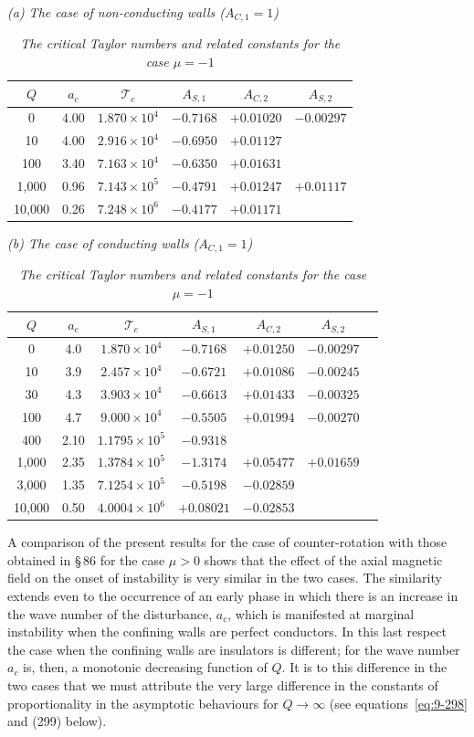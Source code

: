 \begin{table}[ht]
\centering
\caption*{TABLE XLIV}
\caption*{\textit{The critical Taylor numbers and related constants for the case $\mu = -1$}}
\medskip
\textit{(a) The case of non-conducting walls ($A_{C,1} = 1$)}
\begin{tabular}{cccccc}
\hline
$Q$ & $a_c$ & $\mathscr{T}_c$ & $A_{S,1}$ & $A_{C,2}$ & $A_{S,2}$ \\
\hline
0 & 4.00 & $1.870 \times 10^4$ & $-0.7168$ & $+0.01020$ & $-0.00297$ \\
10 & 4.00 & $2.916 \times 10^4$ & $-0.6950$ & $+0.01127$ & \\
100 & 3.40 & $7.163 \times 10^4$ & $-0.6350$ & $+0.01631$ & \\
1,000 & 0.96 & $7.143 \times 10^5$ & $-0.4791$ & $+0.01247$ & $+0.01117$ \\
10,000 & 0.26 & $7.248 \times 10^6$ & $-0.4177$ & $+0.01171$ & \\
\hline
\end{tabular}

\medskip
\textit{(b) The case of conducting walls ($A_{C,1} = 1$)}
\begin{tabular}{ccccccc}
\hline
$Q$ & $a_c$ & $\mathscr{T}_c$ & $A_{S,1}$ & $A_{C,2}$ & $A_{S,2}$ \\
\hline
0 & 4.0 & $1.870 \times 10^4$ & $-0.7168$ & $+0.01250$ & $-0.00297$ \\
10 & 3.9 & $2.457 \times 10^4$ & $-0.6721$ & $+0.01086$ & $-0.00245$ \\
30 & 4.3 & $3.903 \times 10^4$ & $-0.6613$ & $+0.01433$ & $-0.00325$ \\
100 & 4.7 & $9.000 \times 10^4$ & $-0.5505$ & $+0.01994$ & $-0.00270$ \\
400 & 2.10 & $1.1795 \times 10^5$ & $-0.9318$ & & \\
1,000 & 2.35 & $1.3784 \times 10^5$ & $-1.3174$ & $+0.05477$ & $+0.01659$ \\
3,000 & 1.35 & $7.1254 \times 10^5$ & $-0.5198$ & $-0.02859$ & \\
10,000 & 0.50 & $4.0004 \times 10^6$ & $+0.08021$ & $-0.02853$ & \\
\hline
\end{tabular}
\end{table}

A comparison of the present results for the case of counter-rotation with those obtained in \S\,86 for the case $\mu > 0$ shows that the effect of the axial magnetic field on the onset of instability is very similar in the two cases. The similarity extends even to the occurrence of an early phase in which there is an increase in the wave number of the disturbance, $a_c$, which is manifested at marginal instability when the confining walls are perfect conductors. In this last respect the case when the confining walls are insulators is different; for the wave number $a_c$ is, then, a monotonic decreasing function of $Q$. It is to this difference in the two cases that we must attribute the very large difference in the constants of proportionality in the asymptotic behaviours for $Q \to \infty$ (see equations~\eqref{eq:9-298} and (299) below).

